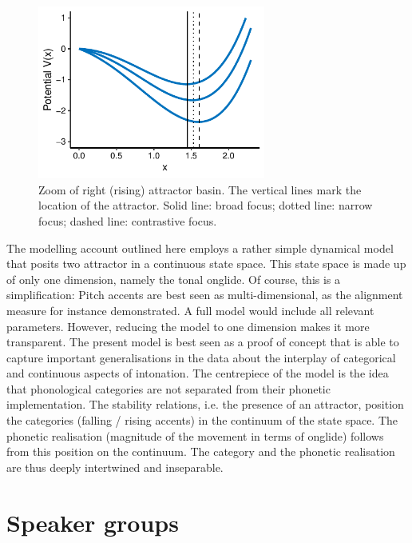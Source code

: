 \begin{figure}
\includegraphics[width=7.5cm]{figures/ch6/right_basin.pdf}
\caption[Zoom of right (rising) attractor basin.]{Zoom of right (rising) attractor basin. The vertical lines mark the location of the attractor. Solid line: broad focus; dotted line: narrow focus; dashed line: contrastive focus.}
\label{fig:right_basin}
\end{figure}

The modelling account outlined here employs a rather simple dynamical mod\-el that posits two attractor in a continuous state space. This state space is made up of only one dimension, namely the tonal onglide. Of course, this is a simplification: Pitch accents are best seen as multi-dimensional, as the alignment measure for instance demonstrated. A full model would include all relevant parameters. However, reducing the model to one dimension makes it more transparent. The present model is best seen as a proof of concept that is able to capture important generalisations in the data about the interplay of categorical and continuous aspects of intonation. The centrepiece of the model is the idea that phonological categories are not separated from their phonetic implementation. The stability relations, i.e. the presence of an attractor, position the categories (falling / rising accents) in the continuum of the state space. The phonetic realisation (magnitude of the movement in terms of onglide) follows from this position on the continuum. The category and the phonetic realisation are thus deeply intertwined and inseparable.

\section{Speaker groups}

